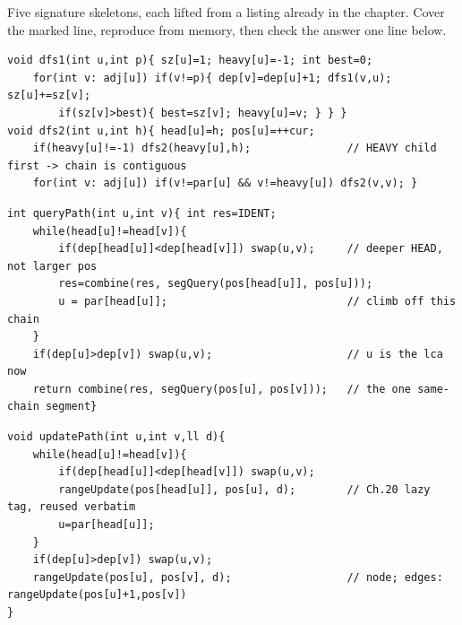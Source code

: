 
Five signature skeletons, each lifted from a listing already in the chapter. Cover
the marked line, reproduce from memory, then check the answer one line below.

\begin{lstlisting}[caption={Drill 1 -- the two DFS passes: heavy child in dfs1, heavy-first recursion in dfs2 (from lst:c16-build)}]
void dfs1(int u,int p){ sz[u]=1; heavy[u]=-1; int best=0;
    for(int v: adj[u]) if(v!=p){ dep[v]=dep[u]+1; dfs1(v,u); sz[u]+=sz[v];
        if(sz[v]>best){ best=sz[v]; heavy[u]=v; } } }
void dfs2(int u,int h){ head[u]=h; pos[u]=++cur;
    if(heavy[u]!=-1) dfs2(heavy[u],h);               // HEAVY child first -> chain is contiguous
    for(int v: adj[u]) if(v!=par[u] && v!=heavy[u]) dfs2(v,v); }
\end{lstlisting}

\begin{lstlisting}[caption={Drill 2 -- the path jump loop: fold the deeper head, climb, finish same-chain (from lst:c16-pathquery)}]
int queryPath(int u,int v){ int res=IDENT;
    while(head[u]!=head[v]){
        if(dep[head[u]]<dep[head[v]]) swap(u,v);     // deeper HEAD, not larger pos
        res=combine(res, segQuery(pos[head[u]], pos[u]));
        u = par[head[u]];                            // climb off this chain
    }
    if(dep[u]>dep[v]) swap(u,v);                     // u is the lca now
    return combine(res, segQuery(pos[u], pos[v]));   // the one same-chain segment}
\end{lstlisting}

\begin{lstlisting}[caption={Drill 3 -- path lazy-update: identical skeleton, range-write instead of range-read (from lst:c16-pathupdate)}]
void updatePath(int u,int v,ll d){
    while(head[u]!=head[v]){
        if(dep[head[u]]<dep[head[v]]) swap(u,v);
        rangeUpdate(pos[head[u]], pos[u], d);        // Ch.20 lazy tag, reused verbatim
        u=par[head[u]];
    }
    if(dep[u]>dep[v]) swap(u,v);
    rangeUpdate(pos[u], pos[v], d);                  // node; edges: rangeUpdate(pos[u]+1,pos[v])
}
\end{lstlisting}

